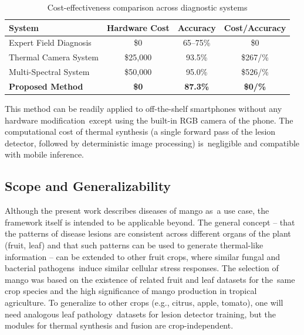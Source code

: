 \documentclass[utf8]{FrontiersinHarvard} %
\begin{document}
\begin{table}[h!]
    \centering
    \caption{Cost-effectiveness comparison across diagnostic systems}
    \label{tab:cost}
    \footnotesize
    \begin{tabular}{lccc}
        \toprule
        \textbf{System} & \textbf{Hardware Cost} & \textbf{Accuracy} & \textbf{Cost/Accuracy} \\
        \midrule
        Expert Field Diagnosis & \$0 & 65--75\% & \$0 \\
        Thermal Camera System & \$25,000 & 93.5\% & \$267/\% \\
        Multi-Spectral System & \$50,000 & 95.0\% & \$526/\% \\
        \textbf{Proposed Method} & \textbf{\$0} & \textbf{87.3\%} & \textbf{\$0/\%} \\
        \bottomrule
    \end{tabular}
\end{table}
This method can be readily applied to off-the-shelf smartphones without any hardware modification except using the built-in RGB camera of the phone. The computational cost of thermal synthesis (a single forward pass of the lesion detector, followed by deterministic image processing) is negligible and compatible with mobile inference. 

\subsection{Scope and Generalizability}
Although the present work describes diseases of mango as a use case, the framework itself is intended to be applicable beyond. The general concept – that the patterns of disease lesions are consistent across different organs of the plant (fruit, leaf) and that such patterns can be used to generate thermal-like information – can be extended to other fruit crops, where similar fungal and bacterial pathogens induce similar cellular stress responses. The selection of mango was based on the existence of related fruit and leaf datasets for the same crop species and the high significance of mango production in tropical agriculture. To generalize to other crops (e.g., citrus, apple, tomato), one will need analogous leaf pathology datasets for lesion detector training, but the modules for thermal synthesis and fusion are crop-independent. 

\begingroup\color{blue}
\end{document}
